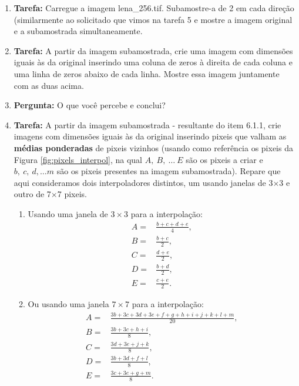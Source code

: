 \documentclass[11pt]{article}
\begin{document}
\begin{enumerate}

\item \textbf{Tarefa:} Carregue a imagem \textsf{lena\_256.tif}.  Subamostre-a de 2 em cada direção ({si\-mi\-lar\-men\-te} ao solicitado que vimos na tarefa 5 e mostre a imagem original e a subamostrada simultaneamente.

\item \textbf{Tarefa:} A partir da imagem subamostrada, crie uma imagem com dimensões iguais às da original inserindo uma coluna de zeros à direita de cada coluna e uma linha de zeros abaixo de cada linha. Mostre essa imagem juntamente com as duas acima. 

\item \textbf{Pergunta:} O que você percebe e conclui?


\item \textbf{Tarefa:} A partir da imagem subamostrada - resultante do item 6.1.1, crie imagens com dimensões iguais às da original inserindo pixeis que valham as \textbf{médias ponderadas} de pixeis vizinhos (usando como referência os pixeis da Figura \ref{fig:pixels_interpol}, na qual $A,~B,~\dots~E $ são os pixeis a criar e $b,~c,~d, \dots m$ são os pixeis presentes na imagem subamostrada). Repare que aqui consideramos dois interpoladores distintos, um usando janelas de 3$\times$3 e outro de 7$\times$7 pixeis. \label{item:interps_def}

\begin{enumerate}
\item Usando uma janela de $3\times 3$ para a interpolação:
\begin{align} A=&\frac{b+c+d+e}{4}, \\ 
 B=&\frac{b+c}{2}, \\
 C=&\frac{d+e}{2}, \\
 D=&\frac{b+d}{2}, \\
 E=&\frac{c+e}{2}.
\end{align}
\item Ou usando uma janela $7\times 7$ para a interpolação:
\begin{align}
A=&\frac{3b+3c+3d+3e+f+g+h+i+j+k+l+m}{20}, \\
B=&\frac{3b+3c+h+i}{8}, \\
C=&\frac{3d+3e+j+k}{8}, \\
D=&\frac{3b+3d+f+l}{8}, \\
E=&\frac{3c+3e+g+m}{8}.
\end{align}


\end{enumerate}
\end{enumerate}
\end{document}
